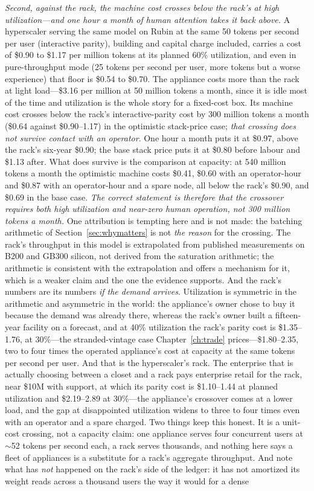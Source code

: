 \emph{Second, against the rack, the machine cost crosses below the rack's at high utilization---and one hour a month of human attention takes it back above.} A hyperscaler serving the same model on Rubin at the same 50 tokens per second per user (interactive parity), building and capital charge included, carries a cost of \$0.90 to \$1.17 per million tokens at its planned 60\% utilization, and even in pure-throughput mode (25 tokens per second per user, more tokens but a worse experience) that floor is \$0.54 to \$0.70. The appliance costs more than the rack at light load---\$3.16 per million at 50 million tokens a month, since it is idle most of the time and utilization is the whole story for a fixed-cost box. Its machine cost crosses below the rack's interactive-parity cost by 300 million tokens a month (\$0.64 against \$0.90--1.17) in the optimistic stack-price case; \emph{that crossing does not survive contact with an operator}. One hour a month puts it at \$0.97, above the rack's six-year \$0.90; the base stack price puts it at \$0.80 before labour and \$1.13 after. What does survive is the comparison at capacity: at 540 million tokens a month the optimistic machine costs \$0.41, \$0.60 with an operator-hour and \$0.87 with an operator-hour and a spare node, all below the rack's \$0.90, and \$0.69 in the base case. \emph{The correct statement is therefore that the crossover requires both high utilization and near-zero human operation, not 300 million tokens a month.} One attribution is tempting here and is not made: the batching arithmetic of Section~\ref{sec:whymatters} is not \emph{the reason} for the crossing. The rack's throughput in this model is extrapolated from published measurements on B200 and GB300 silicon, not derived from the saturation arithmetic; the arithmetic is consistent with the extrapolation and offers a mechanism for it, which is a weaker claim and the one the evidence supports. And the rack's numbers are its numbers \emph{if the demand arrives}. Utilization is symmetric in the arithmetic and asymmetric in the world: the appliance's owner chose to buy it because the demand was already there, whereas the rack's owner built a fifteen-year facility on a forecast, and at 40\% utilization the rack's parity cost is \$1.35--1.76, at 30\%---the stranded-vintage case Chapter~\ref{ch:trade} prices---\$1.80--2.35, two to four times the operated appliance's cost at capacity at the same tokens per second per user. And that is the hyperscaler's rack. The enterprise that is actually choosing between a closet and a rack pays enterprise retail for the rack, near \$10M with support, at which its parity cost is \$1.10--1.44 at planned utilization and \$2.19--2.89 at 30\%---the appliance's crossover comes at a lower load, and the gap at disappointed utilization widens to three to four times even with an operator and a spare charged. Two things keep this honest. It is a unit-cost crossing, not a capacity claim: one appliance serves four concurrent users at $\sim$52 tokens per second each, a rack serves thousands, and nothing here says a fleet of appliances is a substitute for a rack's aggregate throughput. And note what has \emph{not} happened on the rack's side of the ledger: it has not amortized its weight reads across a thousand users the way it would for a dense 